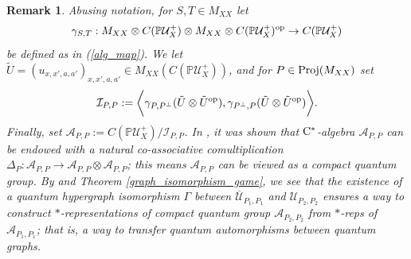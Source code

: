 \documentclass[11pt]{amsart}
\newtheorem{remark}[theorem]{Remark}
\newcommand{\cl}[1]{\mathcal{#1}}
\newcommand{\bb}[1]{\mathbb{#1}}
\begin{document}
\begin{remark}
Abusing notation, for $S, T \in M_{XX}$ let 
\begin{gather*}
	\gamma_{S, T} : M_{XX}\otimes C(\bb{P}\cl{U}_{X}^{+}) \otimes M_{XX}\otimes C(\bb{P}\cl{U}_{X}^{+})^{\rm op} \rightarrow C(\bb{P}\cl{U}_{X}^{+})
\end{gather*}
\noindent be defined as in (\ref{alg_map}). We let $\tilde{U} = (u_{x, x', a, a'})_{x, x', a, a'} \in M_{XX}(C(\bb{P}\cl{U}_{X}^{+}))$, and for $P \in {\rm Proj}(M_{XX})$ set
\begin{gather*}
	\cl{I}_{P, P} := \bigg\langle \gamma_{P, P^{\perp}}(\tilde{U}\otimes \tilde{U}^{\rm op}), \gamma_{P^{\perp}, P}(\tilde{U}\otimes \tilde{U}^{\rm op})\bigg\rangle.
\end{gather*}
\noindent Finally, set $\cl{A}_{P, P} := C(\bb{P}\cl{U}_{X}^{+})/\cl{I}_{P, P}$. In \cite[Remark 7.12]{bhtt}, it was shown that ${\rm C}^{*}$-algebra $\cl{A}_{P, P}$ can be endowed with a natural co-associative comultiplication $\Delta_{P}: \cl{A}_{P, P}\rightarrow \cl{A}_{P, P}\otimes \cl{A}_{P, P}$; this means $\cl{A}_{P, P}$ can be viewed as a compact quantum group. By \cite[Theorem 7.10]{bhtt} and Theorem \ref{graph_isomorphism_game}, we see that the existence of a quantum hypergraph isomorphism $\Gamma$ between $\overline{\cl{U}}_{P_{1}, P_{1}}$ and $\cl{U}_{P_{2}, P_{2}}$ ensures a way to construct $*$-representations of compact quantum group $\cl{A}_{P_{2}, P_{2}}$ from $*$-reps of $\cl{A}_{P_{1}, P_{1}}$; that is, a way to transfer quantum automorphisms between quantum graphs. 
\end{remark}



\end{document}
